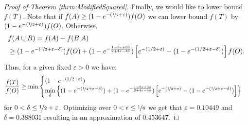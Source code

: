 \begin{proof}[Proof of Theorem \ref{thrm:ModifiedSquared}]
Finally, we would like to lower bound $f(T)$.
Note that if $f(A) \geq (1 - e^{-(\nicefrac[]{1}{2} + \varepsilon)})f(O)$ we can lower bound $f(T)$ by $(1 - e^{-(\nicefrac[]{1}{2} + \varepsilon)})f(O)$.
Otherwise,
\begin{align}
	&f(A \cup B)
	 = \nonumber
	f(A) + f(B|A)
	\\ & \geq
	(1-e^{-(\nicefrac[]{1}{2} + \varepsilon - \delta)})f(O)
	+
	(1-e^{-\frac{1-6\varepsilon+6\delta}{2+4\varepsilon-4\delta}})
	\left[
	e^{-(1/2 + \varepsilon)}
	- (1 - e^{-(1/2 + \varepsilon - \delta)})
	\right] f(O).
\end{align}
Thus, for a given fixed $\varepsilon > 0$ we have:
\begin{equation}
	\frac{f(T)}{f(O)} \geq  \min \begin{cases}
		(1 - e^{-(1/2 + \varepsilon)})
		\\
			\displaystyle{\min_{\delta}}\left\{
			(1-e^{-(\nicefrac[]{1}{2} + \varepsilon - \delta)})
			+
			(1-e^{-\frac{1-6\varepsilon+6\delta}{2+4\varepsilon-4\delta}})
			\left[
			e^{-(\nicefrac[]{1}{2} + \varepsilon)}
			- (1 - e^{-(\nicefrac[]{1}{2} + \varepsilon - \delta)})
			\right]\right\}
	\end{cases}
\end{equation}
for $0 < \delta \leq \nicefrac[]{1}{2} + \varepsilon$.
Optimizing over $0 < \epsilon \leq \nicefrac[]{1}{6}$ we get that $\varepsilon = 0.10449$ and $\delta = 0.388031$ resulting in an approximation of $0.453647$.
\end{proof}


